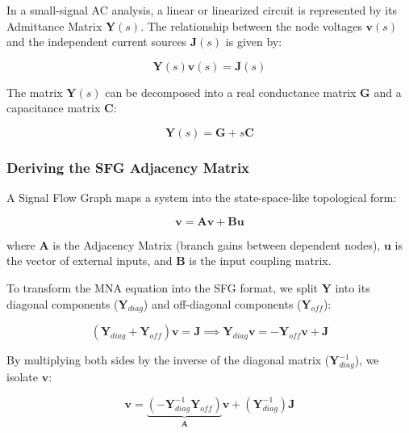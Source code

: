 \documentclass[
]{article}
\begin{document}
In a small-signal AC analysis, a linear or linearized circuit is
represented by its Admittance Matrix \(\mathbf{Y}(s)\). The relationship
between the node voltages \(\mathbf{v}(s)\) and the independent current
sources \(\mathbf{J}(s)\) is given by:

\begin{equation}
    \mathbf{Y}(s)\mathbf{v}(s) = \mathbf{J}(s)
    \label{eq:mna_equation}
\end{equation}

The matrix \(\mathbf{Y}(s)\) can be decomposed into a real conductance
matrix \(\mathbf{G}\) and a capacitance matrix \(\mathbf{C}\):

\begin{equation}
    \mathbf{Y}(s) = \mathbf{G} + s\mathbf{C}
    \label{eq:Y_decomposition_into_G_and_C}
\end{equation}

\subsubsection{Deriving the SFG Adjacency
Matrix}\label{_deriving_the_sfg_adjacency_matrix}

A Signal Flow Graph maps a system into the state-space-like topological
form:

\begin{equation}
    \mathbf{v} = \mathbf{A}\mathbf{v} + \mathbf{B}\mathbf{u}
\end{equation}

where \(\mathbf{A}\) is the Adjacency Matrix (branch gains between
dependent nodes), \(\mathbf{u}\) is the vector of external inputs, and
\(\mathbf{B}\) is the input coupling matrix.

To transform the MNA equation into the SFG format, we split
\(\mathbf{Y}\) into its diagonal components (\(\mathbf{Y}_{diag}\)) and
off-diagonal components (\(\mathbf{Y}_{off}\)):

\begin{equation}
    (\mathbf{Y}_{diag} + \mathbf{Y}_{off})\mathbf{v} = \mathbf{J} \implies
    \mathbf{Y}_{diag}\mathbf{v} = -\mathbf{Y}_{off}\mathbf{v} + \mathbf{J}
\end{equation}

By multiplying both sides by the inverse of the diagonal matrix
(\(\mathbf{Y}_{diag}^{-1}\)), we isolate \(\mathbf{v}\):

\begin{equation}
    \mathbf{v} = \underbrace{(-\mathbf{Y}_{diag}^{-1} \mathbf{Y}_{off})}_{\mathbf{A}} \mathbf{v} + (\mathbf{Y}_{diag}^{-1}) \mathbf{J}
\end{equation}
\end{document}
